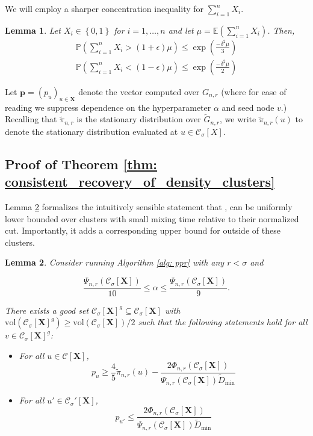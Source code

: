 \documentclass{article}
\let\pprspace\relax
\newcommand{\set}[1]{\left\{#1\right\}}
\newcommand{\vol}{\mathrm{vol}}
\newcommand{\1}{\mathbf{1}}
\newcommand{\pbf}{\mathbf{p}}
\newcommand{\Xbf}{\mathbf{X}}
\newcommand{\Pbb}{\mathbb{P}}
\newcommand{\Ebb}{\mathbb{E}}
\newcommand{\Cset}{\mathcal{C}}
\newcommand{\Csig}{\Cset_{\sigma}}
\newcommand{\pprspace}{{\sc PPR~}}
\theoremstyle{aldenthm}
\newtheorem{lemma}{Lemma}
\begin{document}
We will employ a sharper concentration inequality for $\sum_{i = 1}^{n} X_i$.
\begin{lemma}
	\label{lem: multiplicative_Hoeffding}
	Let $X_i \in \set{0,1}$ for $i = 1, \ldots, n$ and let $\mu = \Ebb(\sum_{i = 1}^n X_i)$. Then,
	\begin{align*}
	\Pbb\left(\sum_{i=1}^{n}X_i > (1 + \epsilon) \mu \right) \leq \exp \left(\frac{-\delta^2 \mu}{3}\right) \\
	\Pbb\left(\sum_{i=1}^{n}X_i < (1 - \epsilon) \mu \right) \leq \exp \left(\frac{-\delta^2 \mu}{2}\right)
	\end{align*}
\end{lemma}

Let $\pbf = (p_u)_{u \in \Xbf}$ denote the \pprspace vector computed over $G_{n,r}$ (where for ease of reading we suppress dependence on the hyperparameter $\alpha$ and seed node $v$.) 
Recalling that $\widetilde{\pi}_{n,r}$ is the stationary distribution over $\widetilde{G}_{n,r}$, we write $\widetilde{\pi}_{n,r}(u)$ to denote the stationary distribution evaluated at $u \in \Csig[X]$. 

\subsection{Proof of Theorem \ref{thm: consistent_recovery_of_density_clusters}}
\label{sec: proof_of_consistent_cluster_recovery}

Lemma \ref{lem: setup} formalizes the intuitively sensible statement that \pprspace, can be uniformly lower bounded over clusters with small mixing time relative to their normalized cut. Importantly, it adds a corresponding upper bound for \pprspace outside of these clusters.
\begin{lemma} 
	\label{lem: setup}
	Consider running Algorithm \ref{alg: ppr} with any $r < \sigma$ and
	
	\begin{equation} 
	\label{eqn: upper_bound_alpha}
	\frac{\Psi_{n,r}(\Csig[\Xbf])}{10} \leq \alpha \leq \frac{\Psi_{n,r}(\Csig[\Xbf])}{9}.
	\end{equation}
	
	There exists a good set $\Csig[\Xbf]^g \subseteq \Csig[\Xbf]$ with $\vol(\Csig[\Xbf]^g) \geq \vol(\Csig[\Xbf])/2$ such that the following statements hold for all $v \in \Csig[\Xbf]^g$:
	\begin{itemize}
		\item For all $u \in \Cset[\Xbf]$,
		\begin{equation}
		\label{eqn: lower_bound_PPR_in_cluster}
		p_u \geq \frac{4}{5} \widetilde{\pi}_{n,r}(u) - \frac{2 \Phi_{n,r}(\Csig[\Xbf])}{\Psi_{n,r}(\Csig[\Xbf]) \widetilde{D}_{\min}}
		\end{equation}
		\item For all $u' \in \Csig'[\Xbf]$,
		\begin{equation}
		\label{eqn: upper_bound_PPR_in_other_cluster}
		p_{u'} \leq \frac{2 \Phi_{n,r}(\Csig[\Xbf])}{\Psi_{n,r}(\Csig[\Xbf]) \widetilde{D}_{\min}}
		\end{equation}
	\end{itemize}
\end{lemma}
\end{document}

